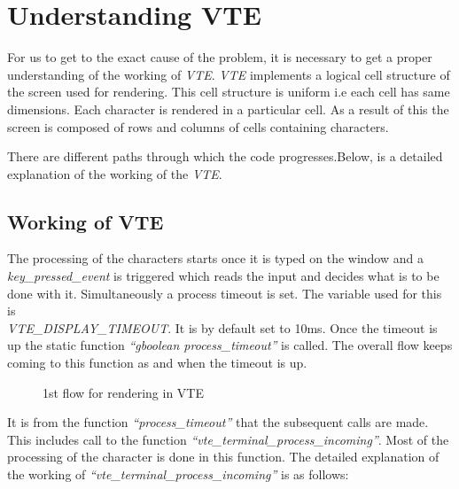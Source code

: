 %

\chapter{Understanding VTE}

For us to get to the exact cause of the problem, it is necessary to get a proper understanding of the working of \textit{VTE}. \textit{VTE} implements a logical cell structure of the screen used for rendering. This cell structure is uniform i.e each cell has same dimensions. Each character is rendered in a particular cell. As a result of this the screen is composed of rows and columns of cells containing characters. 

There are different paths through which the code progresses.Below, is a detailed explanation of the working of the \textit{VTE}.

\section{Working of VTE}

The processing of the characters starts once it is typed on the window and a \\\textit{key\_pressed\_event} is triggered which reads the input and decides what is to be done with it. Simultaneously a process timeout is set. The variable used for this is \\\textit{VTE\_DISPLAY\_TIMEOUT}. It is by default set to 10ms. Once the timeout is up the static function \textit{``gboolean  process\_timeout''} is called. The overall flow keeps coming to this function as and when the timeout is up.

\begin{figure}[htbp]
\centerline{}
\caption{1st flow for rendering in VTE} \label{Gnome Terminal7}
\end{figure}

It is from the function \textit{``process\_timeout''} that the subsequent calls are made. This includes call to the function \textit{``vte\_terminal\_process\_incoming''}. Most of the processing of the character is done in this function. The detailed explanation of the working of \textit{``vte\_terminal\_process\_incoming''} is as follows:	

